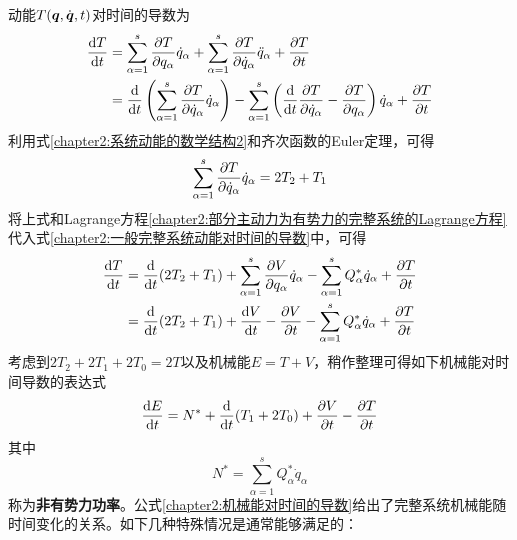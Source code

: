 动能$T(\boldsymbol{q},\dot{\boldsymbol{q}},t)$对时间的导数为
\begin{align}
	\frac{\mathrm{d} T}{\mathrm{d} t} & = \sum_{\alpha=1}^s \frac{\partial T}{\partial q_\alpha}\dot{q}_\alpha + \sum_{\alpha=1}^s \frac{\partial T}{\partial \dot{q}_\alpha} \ddot{q}_\alpha + \frac{\partial T}{\partial t} \nonumber \\
	& = \frac{\mathrm{d}}{\mathrm{d} t}\left(\sum_{\alpha=1}^s \frac{\partial T}{\partial \dot{q}_\alpha}\dot{q}_\alpha\right) - \sum_{\alpha=1}^s\left(\frac{\mathrm{d}}{\mathrm{d} t} \frac{\partial T}{\partial \dot{q}_\alpha} - \frac{\partial T}{\partial q_\alpha}\right)\dot{q}_\alpha + \frac{\partial T}{\partial t}
	\label{chapter2:一般完整系统动能对时间的导数}
\end{align}
利用式\eqref{chapter2:系统动能的数学结构2}和齐次函数的Euler定理，可得
\begin{equation*}
	\sum_{\alpha=1}^s \frac{\partial T}{\partial \dot{q}_\alpha}\dot{q}_\alpha = 2T_2+T_1
\end{equation*}
将上式和Lagrange方程\eqref{chapter2:部分主动力为有势力的完整系统的Lagrange方程}代入式\eqref{chapter2:一般完整系统动能对时间的导数}中，可得
\begin{align*}
	\frac{\mathrm{d} T}{\mathrm{d} t} & = \frac{\mathrm{d}}{\mathrm{d} t}(2T_2+T_1)+\sum_{\alpha=1}^s \frac{\partial V}{\partial q_\alpha}\dot{q}_\alpha-\sum_{\alpha=1}^sQ_\alpha^*\dot{q}_\alpha+\frac{\partial T}{\partial t} \\
	& = \frac{\mathrm{d}}{\mathrm{d} t}(2T_2+T_1)+\frac{\mathrm{d} V}{\mathrm{d} t} - \frac{\partial V}{\partial t} - \sum_{\alpha=1}^sQ_\alpha^*\dot{q}_\alpha + \frac{\partial T}{\partial t}
\end{align*}
考虑到$2T_2+2T_1+2T_0=2T$以及机械能$E=T+V$，稍作整理可得如下机械能对时间导数的表达式
\begin{equation}
	\frac{\mathrm{d} E}{\mathrm{d} t} = N^* + \frac{\mathrm{d}}{\mathrm{d} t}(T_1+2T_0) + \frac{\partial V}{\partial t} - \frac{\partial T}{\partial t}
	\label{chapter2:机械能对时间的导数}
\end{equation}
其中
\begin{equation}
	N^* = \sum_{\alpha=1}^sQ_\alpha^*\dot{q}_\alpha
	\label{chapter2:非有势力功率}
\end{equation}
称为{\bf 非有势力功率}。公式\eqref{chapter2:机械能对时间的导数}给出了完整系统机械能随时间变化的关系。如下几种特殊情况是通常能够满足的：
